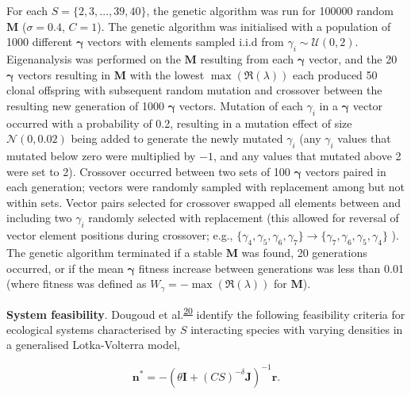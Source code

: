 \documentclass[]{article}
\begin{document}
For each \(S = \{2, 3, ..., 39, 40\}\), the genetic algorithm was run
for 100000 random \(\mathbf{M}\) (\(\sigma = 0.4\), \(C = 1\)). The
genetic algorithm was initialised with a population of 1000 different
\(\mathbf{\gamma}\) vectors with elements sampled i.i.d from
\(\gamma_{i} \sim \mathcal{U}(0, 2)\). Eigenanalysis was performed on
the \(\mathbf{M}\) resulting from each \(\mathbf{\gamma}\) vector, and
the 20 \(\mathbf{\gamma}\) vectors resulting in \(\mathbf{M}\) with the
lowest \(\max\left(\Re(\lambda)\right)\) each produced 50 clonal
offspring with subsequent random mutation and crossover between the
resulting new generation of 1000 \(\mathbf{\gamma}\) vectors. Mutation
of each \(\gamma_{i}\) in a \(\mathbf{\gamma}\) vector occurred with a
probability of 0.2, resulting in a mutation effect of size
\(\mathcal{N}(0, 0.02)\) being added to generate the newly mutated
\(\gamma_{i}\) (any \(\gamma_{i}\) values that mutated below zero were
multiplied by \(-1\), and any values that mutated above 2 were set to
2). Crossover occurred between two sets of 100 \(\mathbf{\gamma}\)
vectors paired in each generation; vectors were randomly sampled with
replacement among but not within sets. Vector pairs selected for
crossover swapped all elements between and including two \(\gamma_{i}\)
randomly selected with replacement (this allowed for reversal of vector
element positions during crossover; e.g.,
\(\{\gamma_{4}, \gamma_{5}, \gamma_{6}, \gamma_{7}\} \to \{\gamma_{7}, \gamma_{6}, \gamma_{5}, \gamma_{4}\}\)
). The genetic algorithm terminated if a stable \(\mathbf{M}\) was
found, 20 generations occurred, or if the mean \(\mathbf{\gamma}\)
fitness increase between generations was less than 0.01 (where fitness
was defined as \(W_{\gamma} = -\max\left(\Re(\lambda)\right)\) for
\(\mathbf{M}\)).

\textbf{System feasibility}. Dougoud et
al.\textsuperscript{\protect\hyperlink{ref-Dougoud2018}{20}} identify
the following feasibility criteria for ecological systems characterised
by \(S\) interacting species with varying densities in a generalised
Lotka-Volterra model,

\[\mathbf{n^{*}} = -\left(\theta \mathbf{I} + (CS)^{-\delta}\mathbf{J} \right)^{-1}\mathbf{r}.\]
\end{document}

